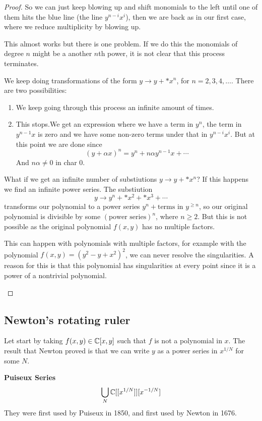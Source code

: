 \begin{proof}
    So we can just keep blowing up and shift monomials to the left until one of them hits the blue line (the line $y^{n-i}x^i$), then we are back as in our first case, where we reduce multiplicity by blowing up.

    This almost works but there is one problem. If we do this the monomials of degree $n$ might be a another $n$th power, it is not clear that this process terminates.

    We keep doing transformations of the form $y\rightarrow y+\ast x^n$, for $n=2,3,4,\ldots$. There are two possibilities:\begin{enumerate}
        \item We keep going through this process an infinite amount of times.
        \item This stops.We get an expression where we have a term in $y^n$, the term in $y^{n-1}x$ is zero and we have some non-zero terms under that in $y^{n-i}x^i$. But at this point we are done since \[{(y+\alpha x)}^n = y^n+n\alpha y^{n-1}x+\cdots\] And $n\alpha\neq 0$ in char $0$.
    \end{enumerate}
What if we get an infinite number of substiutions $y\rightarrow y+\ast x^n$? If this happens we find an infinite power series. The substiution \[y\rightarrow y^n+\ast x^2+\ast x^3+\cdots\]
transforms our polynomial to a power series $y^n + \text{terms in }y^{\geq n}$, so our original polynomial is divisible by some ${(\text{power series})}^n$, where $n\geq 2$. But this is not possible as the original polynomial $f(x,y)$ has no multiple factors.
\begin{remark}
This can happen with polynomials with multiple factors, for example with the polynomial $f(x,y) = {(y^2-y+x^2)}^2$, we can never resolve the singularities. A reason for this is that this polynomial has singularities at every point since it is a power 
of a nontrivial polynomial.
\end{remark}
\end{proof}

\subsection{Newton's rotating ruler}
Let start by taking $f(x,y)\in \mathbb{C}[x,y]$ such that $f$ is not a polynomial in $x$. The result that Newton proved is that we can write $y$ as a power series in $x^{1/N}$ for some $N$.

\begin{definition}
    \textbf{Puiseux Series} \[\bigcup_N \mathbb{C}[[x^{1/N}]][x^{-1/N}]\]
    They were first used by Puiseux in 1850, and first used by Newton in 1676.
\end{definition}


